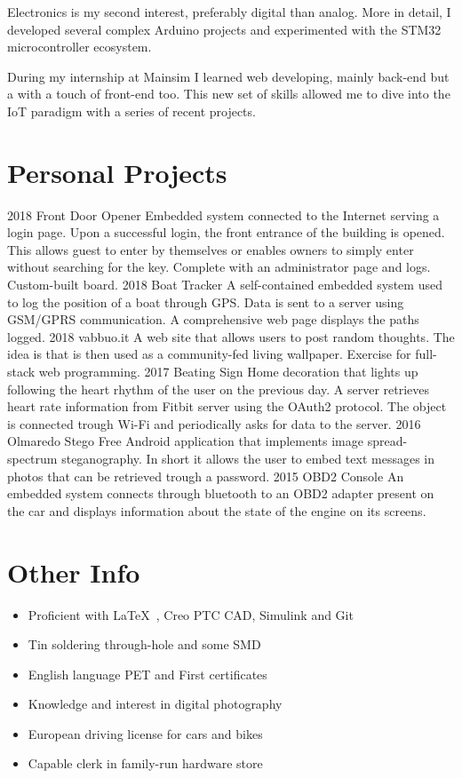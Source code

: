 \documentclass[]{friggeri-cv}
\begin{document}
	Electronics is my second interest, preferably digital than analog. More in detail, I developed several complex Arduino projects and experimented with the STM32 microcontroller ecosystem.
	
	During my internship at Mainsim I learned web developing, mainly back-end but a with a touch of front-end too. This new set of skills allowed me to dive into the IoT paradigm with a series of recent projects. 
	
	
\section{Personal Projects}
\begin{entrylist}
	\entry
	{2018}
	{Front Door Opener}
	{}
	{Embedded system connected to the Internet serving a login page. Upon a successful login, the front entrance of the building is opened. This allows guest to enter by themselves or enables owners to simply enter without searching  for the key. Complete with an administrator page and logs. Custom-built board.}
	\entry
	{2018}
	{Boat Tracker}
	{}
	{A self-contained embedded system used to log the position of a boat through GPS. Data is sent to a server using GSM/GPRS communication. A comprehensive web page displays the paths logged.}
	\entry
	{2018}
	{vabbuo.it}
	{}
	{A web site that allows users to post random thoughts. The idea is that is then used as a community-fed living wallpaper. Exercise for full-stack web programming.}
	\entry	
	{2017}
	{Beating Sign}
	{}
	{Home decoration that lights up following the heart rhythm of the user on the previous day. A server retrieves heart rate information from Fitbit server using the OAuth2 protocol. The object is connected trough Wi-Fi and periodically asks for data to the server.}	
	\entry
	{2016}
	{Olmaredo Stego}
	{}
	{Free Android application that implements image spread-spectrum steganography. In short it allows the user to embed text messages in photos that can be retrieved trough a password.}
	\entry
	{2015}
	{OBD2 Console}
	{}
	{An embedded system connects through bluetooth to an OBD2 adapter present on the car and displays information about the state of the engine on its screens.}	
\end{entrylist}
	
\clearpage
\section{Other Info}
\vspace{-7pt}
\begin{itemize}
	\itemsep-0.4em
	\item Proficient with \LaTeX\ , Creo PTC CAD, Simulink and Git
	\item Tin soldering through-hole and some SMD
	\item English language PET and First certificates
	\item Knowledge and interest in digital photography
	\item European driving license for cars and bikes	
	\item Capable clerk in family-run hardware store	
\end{itemize}
\end{document}
